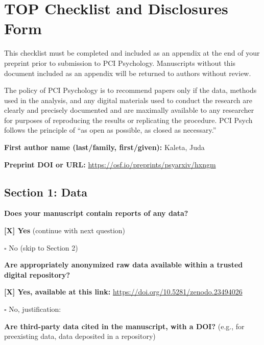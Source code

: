 \documentclass[
  12pt,
]{article}
\begin{document}
\printbibliography

\newpage

\hypertarget{top-checklist}{%
\section*{TOP Checklist and Disclosures Form}\label{top-checklist}}

This checklist must be completed and included as an appendix at the end of your preprint prior to submission to PCI Psychology. Manuscripts without this document included as an appendix will be returned to authors without review.

The policy of PCI Psychology is to recommend papers only if the data, methods used in the analysis, and any digital materials used to conduct the research are clearly and precisely documented and are maximally available to any researcher for purposes of reproducing the results or replicating the procedure. PCI Psych follows the principle of ``as open as possible, as closed as necessary.''

\bigskip

\textbf{First author name (last/family, first/given):} Kaleta, Juda

\textbf{Preprint DOI or URL:} \url{https://osf.io/preprints/psyarxiv/hxngm}

\bigskip

\hypertarget{section-1-data}{%
\subsection*{Section 1: Data}\label{section-1-data}}

\textbf{Does your manuscript contain reports of any data?}

\textbf{[X] Yes} (continue with next question)

\quad $\square$ No (skip to Section 2)

\bigskip

\textbf{Are appropriately anonymized raw data available within a trusted digital repository?}

\textbf{[X] Yes, available at this link:} \url{https://doi.org/10.5281/zenodo.23494026}

\quad $\square$ No, justification:

\bigskip

\textbf{Are third-party data cited in the manuscript, with a DOI?} (e.g., for preexisting data, data deposited in a repository)
\end{document}
